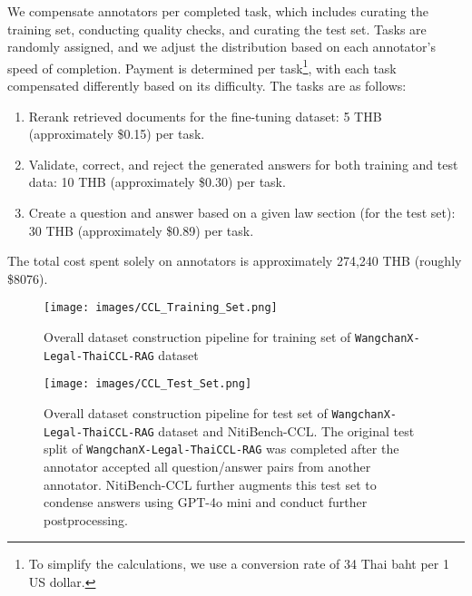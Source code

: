 We compensate annotators per completed task, which includes curating the training set, conducting quality checks, and curating the test set. 
%
Tasks are randomly assigned, and we adjust the distribution based on each annotator’s speed of completion. 
%
Payment is determined per task\footnote{To simplify the calculations, we use a conversion rate of 34 Thai baht per 1 US dollar.}, with each task compensated differently based on its difficulty. The tasks are as follows:

\begin{enumerate}
\item Rerank retrieved documents for the fine-tuning dataset: 5 THB (approximately \$0.15) per task.
%
\item Validate, correct, and reject the generated answers for both training and test data: 10 THB (approximately \$0.30) per task.
%
\item Create a question and answer based on a given law section (for the test set): 30 THB (approximately \$0.89) per task.
\end{enumerate}
%
The total cost spent solely on annotators is approximately 274,240 THB (roughly \$8076).

\begin{figure}[H]
    \centering
    \texttt{[image: images/CCL\_Training\_Set.png]}    
    \caption{Overall dataset construction pipeline for training set of \texttt{WangchanX-Legal-ThaiCCL-RAG} dataset}
    \label{fig:wcx_pipeline_train}
\end{figure}

\begin{figure}[H]
    \centering
    \texttt{[image: images/CCL\_Test\_Set.png]}    
    \caption{Overall dataset construction pipeline for test set of \texttt{WangchanX-Legal-ThaiCCL-RAG} dataset and NitiBench-CCL. The original test split of \texttt{WangchanX-Legal-ThaiCCL-RAG} was completed after the annotator accepted all question/answer pairs from another annotator. NitiBench-CCL further augments this test set to condense answers using GPT-4o mini and conduct further postprocessing.}
    \label{fig:wcx_pipeline_test}
\end{figure}

